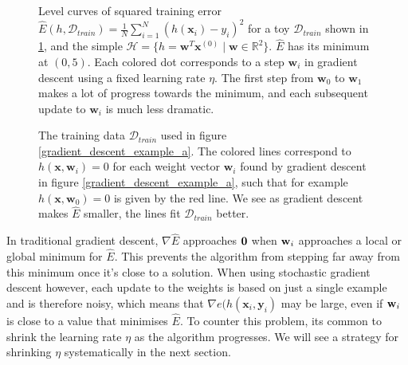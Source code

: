 \begin{figure}
	\hspace{9mm}
	\caption{Level curves of squared training error $\hat{E}(h, \mathcal{D}_{train}) = \frac{1}{N}\sum_{i=1}^N(h(\mathbf{x}_i) - y_i)^2$ for a toy $\mathcal{D}_{train}$ shown in \ref{gradient_descent_example_b}, and the simple $\mathcal{H} = \{h = \mathbf{w}^T\mathbf{x}^{(0)} \mid \mathbf{w} \in \mathbb{R}^2\}$. $\hat{E}$ has its minimum at $(0, 5)$. Each colored dot corresponds to a step $\mathbf{w}_i$ in gradient descent using a fixed learning rate $\eta$. The first step from $\mathbf{w}_0$ to $\mathbf{w}_1$ makes a lot of progress towards the minimum, and each subsequent update to $\mathbf{w}_i$ is much less dramatic.}
	\label{gradient_descent_example_a}
	\vspace{10mm}
	
	\caption{The training data $\mathcal{D}_{train}$ used in figure \ref{gradient_descent_example_a}. The colored lines correspond to $h(\mathbf{x}, \mathbf{w}_i) = 0$ for each weight vector $\mathbf{w}_i$ found by gradient descent in figure \ref{gradient_descent_example_a}, such that for example $h(\mathbf{x}, \mathbf{w}_0) = 0$ is given by the red line. We see as gradient descent makes $\hat{E}$ smaller, the lines fit $\mathcal{D}_{train}$ better.}
	\label{gradient_descent_example_b}
\end{figure}
\noindent
In traditional gradient descent, $\nabla \hat{E}$ approaches $\mathbf{0}$ when $\mathbf{w}_i$ approaches a local or global minimum for $\hat{E}$. This prevents the algorithm from stepping far away from this minimum once it's close to a solution. When using stochastic gradient descent however, each update to the weights is based on just a single example and is therefore noisy, which means that $\nabla e(h(\mathbf{x}_i, \mathbf{y}_i)$ may be large, even if $\mathbf{w}_i$ is close to a value that minimises $\hat{E}$. To counter this problem, its common to shrink the learning rate $\eta$ as the algorithm progresses. We will see a strategy for shrinking $\eta$ systematically in the next section.

